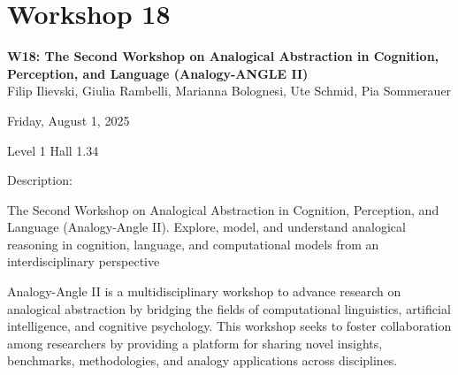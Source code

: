 \clearpage



\section[W18: The Second Workshop on Analogical Abstraction in Cognition, Perception, and Language (Analogy-ANGLE II)]{Workshop 18}
\label{workshop_18}

\begin{center}
    {\Large \textbf{W18: The Second Workshop on Analogical Abstraction in Cognition, Perception, and Language (Analogy-ANGLE II)}}\\
    

  Filip Ilievski, Giulia Rambelli, Marianna Bolognesi, Ute Schmid, Pia Sommerauer

    Friday, August 1, 2025
    
   Level 1 Hall 1.34
\end{center}

Description: 

The Second Workshop on Analogical Abstraction in Cognition, Perception, and Language (Analogy-Angle II). 
Explore, model, and understand analogical reasoning in cognition, language, and computational models from an interdisciplinary perspective

Analogy-Angle II is a multidisciplinary workshop to advance research on analogical abstraction by bridging the fields of computational linguistics, artificial intelligence, and cognitive psychology. This workshop seeks to foster collaboration among researchers by providing a platform for sharing novel insights, benchmarks, methodologies, and analogy applications across disciplines.


